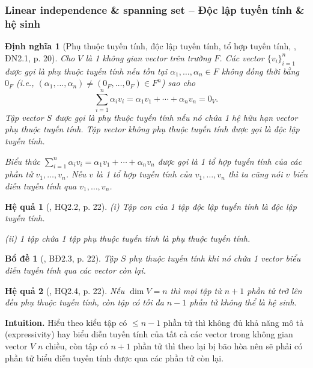 \documentclass{article}
\newtheorem{bode}{Bổ đề}
\newtheorem{dinhnghia}{Định nghĩa}
\newtheorem{hequa}{Hệ quả}
\begin{document}

\subsubsection{Linear independence \& spanning set -- Độc lập tuyến tính \& hệ sinh}

\begin{dinhnghia}[Phụ thuộc tuyến tính, độc lập tuyến tính, tổ hợp tuyến tính, \cite{Hoa_linear_algebra}, ĐN2.1, p. 20]
	Cho $V$ là 1 không gian vector trên trường $F$. Các vector $\{v_i\}_{i=1}^n$ được gọi là {\rm phụ thuộc tuyến tính} nếu tồn tại $\alpha_1,\ldots,\alpha_n\in F$ không đồng thời bằng $0_F$ (i.e., $(\alpha_1,\ldots,\alpha_n)\ne(0_F,\ldots,0_F)\in F^n$) sao cho
	\begin{equation*}
		\sum_{i=1}^n \alpha_iv_i = \alpha_1v_1 + \cdots + \alpha_nv_n = 0_V.
	\end{equation*}
	Tập vector $S$ được gọi là {\rm phụ thuộc tuyến tính} nếu nó chứa 1 hệ hữu hạn vector phụ thuộc tuyến tính. Tập vector không phụ thuộc tuyến tính được gọi là {\rm độc lập tuyến tính}.
	
	Biểu thức $\sum_{i=1}^n \alpha_iv_i = \alpha_1v_1 + \cdots + \alpha_nv_n$ được gọi là 1 {\rm tổ hợp tuyến tính} của các phần tử $v_1,\ldots,v_n$. Nếu $v$ là 1 tổ hợp tuyến tính của $v_1,\ldots,v_n$ thì ta cũng nói $v$ {\rm biểu diễn tuyến tính} qua $v_1,\ldots,v_n$.
\end{dinhnghia}

\begin{hequa}[\cite{Hoa_linear_algebra}, HQ2.2, p. 22]
	(i) Tập con của 1 tập độc lập tuyến tính là độc lập tuyến tính.
	\item(ii) 1 tập chứa 1 tập phụ thuộc tuyến tính là phụ thuộc tuyến tính.
\end{hequa}

\begin{bode}[\cite{Hoa_linear_algebra}, BĐ2.3, p. 22]
	Tập $S$ phụ thuộc tuyến tính khi nó chứa 1 vector biểu diễn tuyến tính qua các vector còn lại.
\end{bode}

\begin{hequa}[\cite{Hoa_linear_algebra}, HQ2.4, p. 22]
	Nếu $\dim V = n$ thì mọi tập từ $n + 1$ phần tử trở lên đều phụ thuộc tuyến tính, còn tập có tối đa $n - 1$ phần tử không thể là hệ sinh.
\end{hequa}
{\bf Intuition.} Hiểu theo kiểu tập có $\le n - 1$ phần tử thì không đủ khả năng mô tả (expressivity) hay biểu diễn tuyến tính của tất cả các vector trong không gian vector $V$ $n$ chiều, còn tập có $n + 1$ phần tử thì theo lại bị bão hòa nên sẽ phải có phần tử biểu diễn tuyến tính được qua các phần tử còn lại.
\end{document}
